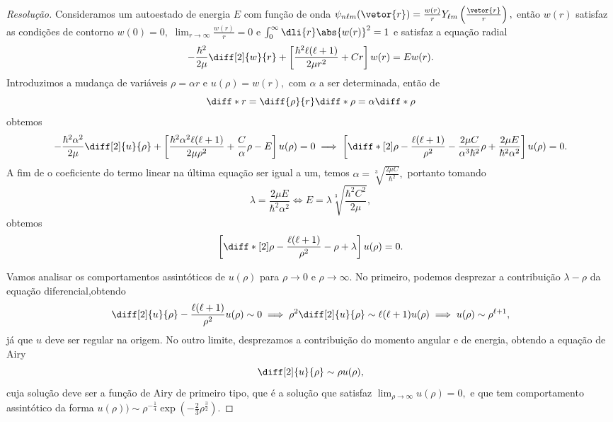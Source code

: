 \begin{proof}[Resolução]
   Consideramos um autoestado de energia \(E\) com função de onda \(\psi_{n\ell m}(\vetor{r}) = \frac{w(r)}{r}Y_{\ell m}\left(\frac{\vetor{r}}{r}\right),\) então \(w(r)\) satisfaz as condições de contorno \(w(0) = 0,\) \(\lim_{r\to\infty}{\frac{w(r)}{r}} = 0\) e \(\int_{0}^\infty\dli{r} \abs{w(r)}^2 = 1\) e satisfaz a equação radial
   \begin{equation*}
      -\frac{\hbar^2}{2\mu}\diff[2]{w}{r} + \left[\frac{\hbar^2\ell(\ell+1)}{2\mu r^2} + C r\right]w(r) = E w(r).
   \end{equation*}
   Introduzimos a mudança de variáveis \(\rho = \alpha r\) e \(u(\rho) = w(r),\) com \(\alpha\) a ser determinada, então de
   \begin{equation*}
      \diff*{}{r} = \diff{\rho}{r} \diff*{}{\rho} = \alpha \diff*{}{\rho}
   \end{equation*}
   obtemos
   \begin{equation*}
      -\frac{\hbar^2\alpha^2}{2\mu} \diff[2]{u}{\rho} + \left[\frac{\hbar^2\alpha^2 \ell(\ell + 1)}{2\mu \rho^2} + \frac{C}{\alpha}\rho - E\right]u(\rho) = 0 \implies
      \left[\diff*[2]{}{\rho} - \frac{\ell(\ell+1)}{\rho^2} - \frac{2\mu C}{\alpha^3 \hbar^2}\rho + \frac{2\mu E}{\hbar^2 \alpha^2}\right]u(\rho) = 0.
   \end{equation*}
   A fim de o coeficiente do termo linear na última equação ser igual a um, temos \(\alpha = \sqrt[3]{\frac{2\mu C}{\hbar^2}},\) portanto tomando
   \begin{equation*}
      \lambda = \frac{2\mu E}{\hbar^2 \alpha^2} \iff E = \lambda\sqrt[3]{\frac{\hbar^2C^2}{2\mu}},
   \end{equation*}
   obtemos
   \begin{equation*}
      \left[\diff*[2]{}{\rho} - \frac{\ell(\ell+1)}{\rho^2} - \rho + \lambda\right]u(\rho) = 0.
   \end{equation*}

   Vamos analisar os comportamentos assintóticos de \(u(\rho)\) para \(\rho \to 0\) e \(\rho \to \infty.\) No primeiro, podemos desprezar a contribuição \(\lambda - \rho\) da equação diferencial,obtendo
   \begin{equation*}
      \diff[2]{u}{\rho} - \frac{\ell(\ell+1)}{\rho^2}u(\rho) \sim 0 \implies \rho^2 \diff[2]{u}{\rho} \sim \ell (\ell + 1) u(\rho) \implies u(\rho) \sim \rho^{\ell+1},
   \end{equation*}
   já que \(u\) deve ser regular na origem. No outro limite, desprezamos a contribuição do momento angular e de energia, obtendo a equação de Airy
   \begin{equation*}
      \diff[2]{u}{\rho} \sim \rho u(\rho),
   \end{equation*}
   cuja solução deve ser a função de Airy de primeiro tipo, que é a solução que satisfaz \(\displaystyle\lim_{\rho\to\infty}{u(\rho)} = 0,\) e que tem comportamento assintótico da forma \(u(\rho)) \sim \rho^{-\frac14} \exp\left(-\frac23 \rho^{\frac32}\right).\)


\end{proof}
